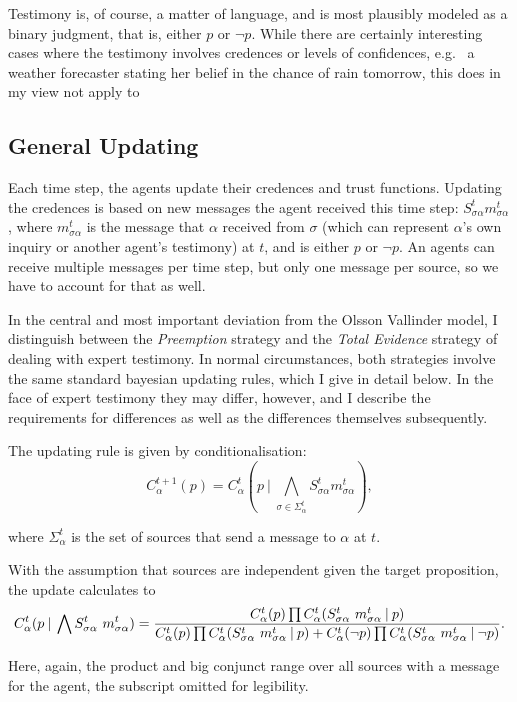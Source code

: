\documentclass[11pt, a4paper]{article}
\newcommand{\Stsa}{S^t_{\sigma\alpha}}
\newcommand{\sa}{{\sigma\alpha}}
\newcommand{\given}[1][]{\:#1\vert\:}
\newcommand{\Sm}{\Stsa~m^t_{\sa}}
\renewcommand{\i}[1]{\emph{#1}}
\renewcommand{\a}{\alpha}
\begin{document}
Testimony is, of course, a matter of language, and is most plausibly modeled as a binary judgment, that is, either $p$ or $\neg p$. While there are certainly interesting cases where the testimony involves credences or levels of confidences, e.g. \ a weather forecaster stating her belief in the chance of rain tomorrow, this does in my view not apply to  

\subsection{General Updating}

Each time step, the agents update their credences and trust functions. Updating the credences is based on new messages the agent received this time step: $\Stsa m^t_{\sa}$, where $m^t_{\sa}$ is the message that $\alpha$ received from $\sigma$ (which can represent $\alpha$'s own inquiry or another agent's testimony) at $t$, and is either $p$ or $\neg p$. An agents can receive multiple messages per time step, but only one message per source, so we have to account for that as well. 

In the central and most important deviation from the Olsson Vallinder model, I distinguish between the \i{Preemption} strategy and the \i{Total Evidence} strategy of dealing with expert testimony. In normal circumstances, both strategies involve the same standard bayesian updating rules, which I give in detail below. In the face of expert testimony they may differ, however, and I describe the requirements for differences as well as the differences themselves subsequently. 

The updating rule is given by conditionalisation:
\[
    C^{t+1}_\alpha (p) = C^t_\alpha (p \given \bigwedge_{\sigma \in \Sigma^t_\alpha} \Stsa m^t_{\sa}),
\]

where $\Sigma^t_\alpha$ is the set of sources that send a message to $\alpha$ at $t$.

With the assumption that sources are independent given the target proposition, the update calculates to
\begin{equation}
    \label{eq:upd}
    C^t_\a (p \given \bigwedge \Sm) = \\
     \frac{C^t_\a (p) \prod C^t_\a (\Sm \given p) }
    {C^t_\a (p) \prod C^t_\a (\Sm \given p) +  C^t_\a (\neg p) \prod C^t_\a (\Sm \given \neg p) }.
\end{equation}

Here, again, the product and big conjunct range over all sources with a message for the agent, the subscript omitted for legibility.   
\end{document}
